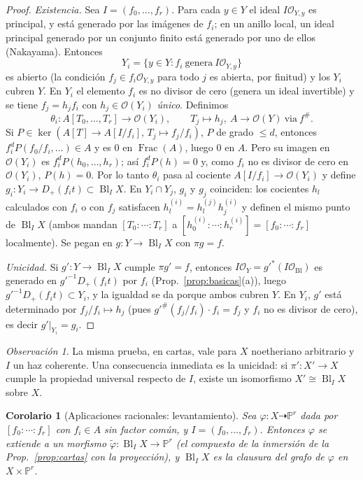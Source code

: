 \documentclass[11pt,a4paper,oneside]{book}
\newcommand{\Bl}{\operatorname{Bl}}
\newcommand{\Frac}{\operatorname{Frac}}
\newcommand{\PP}{\mathbb{P}}
\newcommand{\cO}{\mathcal{O}}
\theoremstyle{plain}
\newtheorem{corolario}[teorema]{Corolario}
\theoremstyle{definition}
\theoremstyle{remark}
\newtheorem{observacion}[teorema]{Observación}
\begin{document}
\begin{proof}
\emph{Existencia.} Sea $I=(f_0,\dots,f_r)$. Para cada $y\in Y$ el ideal $I\cO_{Y,y}$ es principal, y está generado por las imágenes de $f_i$; en un anillo local, un ideal principal generado por un conjunto finito está generado por uno de ellos (Nakayama). Entonces
\[
Y_i=\{y\in Y: f_i\ \text{genera}\ I\cO_{Y,y}\}
\]
es abierto (la condición $f_j\in f_i\cO_{Y,y}$ para todo $j$ es abierta, por finitud) y los $Y_i$ cubren $Y$. En $Y_i$ el elemento $f_i$ es no divisor de cero (genera un ideal invertible) y se tiene $f_j=h_jf_i$ con $h_j\in\cO(Y_i)$ \emph{único}. Definimos
\[
\theta_i:A[T_0,\dots,T_r]\to\cO(Y_i),\qquad T_j\mapsto h_j,\ A\to\cO(Y)\ \text{via}\ f^\#.
\]
Si $P\in\ker(A[T]\to A[I/f_i],\,T_j\mapsto f_j/f_i)$, $P$ de grado $\le d$, entonces $f_i^dP(f_0/f_i,\dots)\in A$ y es $0$ en $\Frac(A)$, luego $0$ en $A$. Pero su imagen en $\cO(Y_i)$ es $f_i^dP(h_0,\dots,h_r)$; así $f_i^dP(h)=0$ y, como $f_i$ no es divisor de cero en $\cO(Y_i)$, $P(h)=0$. Por lo tanto $\theta_i$ pasa al cociente $A[I/f_i]\to\cO(Y_i)$ y define $g_i:Y_i\to D_+(f_it)\subset\Bl_IX$. En $Y_i\cap Y_j$, $g_i$ y $g_j$ coinciden: los cocientes $h_l$ calculados con $f_i$ o con $f_j$ satisfacen $h_l^{(i)}=h_l^{(j)}h_j^{(i)}$ y definen el mismo punto de $\Bl_IX$ (ambos mandan $[T_0:\cdots:T_r]$ a $[h^{(i)}_0:\cdots:h^{(i)}_r]=[f_0:\cdots:f_r]$ localmente). Se pegan en $g:Y\to\Bl_IX$ con $\pi g=f$.

\emph{Unicidad.} Si $g':Y\to\Bl_IX$ cumple $\pi g'=f$, entonces $I\cO_Y=g'^*(I\cO_{\Bl})$ es generado en $g'^{-1}D_+(f_it)$ por $f_i$ (Prop.~\ref{prop:basicas}(a)), luego $g'^{-1}D_+(f_it)\subset Y_i$, y la igualdad se da porque ambos cubren $Y$. En $Y_i$, $g'$ está determinado por $f_j/f_i\mapsto h_j$ (pues $g'^\#(f_j/f_i)\cdot f_i=f_j$ y $f_i$ no es divisor de cero), es decir $g'|_{Y_i}=g_i$.
\end{proof}

\begin{observacion}
La misma prueba, en cartas, vale para $X$ noetheriano arbitrario y $I$ un haz coherente. Una consecuencia inmediata es la unicidad: si $\pi':X'\to X$ cumple la propiedad universal respecto de $I$, existe un isomorfismo $X'\cong\Bl_IX$ sobre $X$.
\end{observacion}

\begin{corolario}[Aplicaciones racionales: levantamiento]\label{cor:levanta}
Sea $\varphi:X\dashrightarrow\PP^r$ dada por $[f_0:\cdots:f_r]$ con $f_i\in A$ sin factor común, y $I=(f_0,\dots,f_r)$. Entonces $\varphi$ se extiende a un morfismo $\tilde\varphi:\Bl_IX\to\PP^r$ (el compuesto de la inmersión de la Prop.~\ref{prop:cartas} con la proyección), y $\Bl_IX$ es la clausura del grafo de $\varphi$ en $X\times\PP^r$.
\end{corolario}
\end{document}
